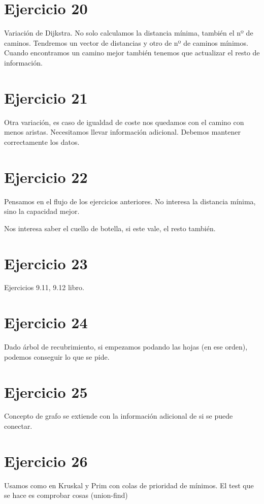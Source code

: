 \documentclass[10pt,a4paper,openright]{book}
\theoremstyle{break}
\begin{document}
\section{Ejercicio 20}%
\label{sec:ejercicio_20_4}
Variación de Dijkstra. No solo calculamos la distancia mínima, también el nº de caminos. Tendremos un vector de distancias y otro de nº de caminos mínimos. Cuando encontramos un camino mejor también tenemos que actualizar el resto de información.

\section{Ejercicio 21}%
\label{sec:ejercicio_21_4}
Otra variación, es caso de igualdad de coste nos quedamos con el camino con menos aristas. Necesitamos llevar información adicional. Debemos mantener correctamente los datos.

\section{Ejercicio 22}%
\label{sec:ejercicio_22_4}
Pensamos en el flujo de los ejercicios anteriores. No interesa la distancia mínima, sino la capacidad mejor.

Nos interesa saber el cuello de botella, si este vale, el resto también.

\section{Ejercicio 23}%
\label{sec:ejercicio_23_4}
Ejercicios 9.11, 9.12 libro.

\section{Ejercicio 24}%
\label{sec:ejercicio_24_4}
Dado árbol de recubrimiento, si empezamos podando las hojas (en ese orden), podemos conseguir lo que se pide.

\section{Ejercicio 25}%
\label{sec:ejercicio_25_4}
Concepto de grafo se extiende con la información adicional de si se puede conectar.

\section{Ejercicio 26}%
\label{sec:ejercicio_26_4}
Usamos como en Kruskal y Prim con colas de prioridad de mínimos. El test que se hace es comprobar cosas (union-find)
\end{document}
